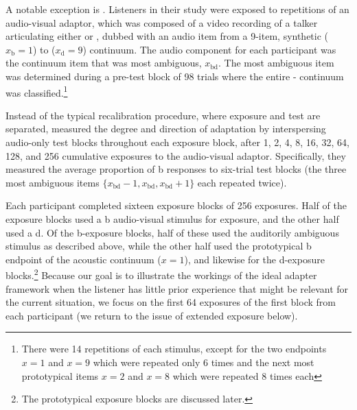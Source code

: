 A notable exception is .  Listeners in their study were exposed to repetitions of an audio-visual adaptor, which was composed of a video recording of a talker articulating either  or , dubbed with an audio item from a 9-item, synthetic  ($x_\mathrm{b}=1$) to  ($x_\mathrm{d}=9$) continuum.  The audio component for each participant was the continuum item that was most ambiguous, $x_\mathrm{bd}$.  The most ambiguous item was determined during a pre-test block of 98 trials where the entire - continuum was classified.\footnote{There were 14 repetitions of each stimulus, except for the two endpoints $x=1$ and $x=9$ which were repeated only 6 times and the next most prototypical items $x=2$ and $x=8$ which were repeated 8 times each}

Instead of the typical recalibration procedure, where exposure and test are separated,  measured the degree and direction of adaptation by interspersing audio-only test blocks throughout each exposure block, after 1, 2, 4, 8, 16, 32, 64, 128, and 256 cumulative exposures to the audio-visual adaptor.  Specifically, they measured the average proportion of \ph b responses to six-trial test blocks (the three most ambiguous items $\{x_\mathrm{bd}-1, x_\mathrm{bd}, x_\mathrm{bd}+1\}$ each repeated twice).

Each participant completed sixteen exposure blocks of 256 exposures.  Half of the exposure blocks used a \ph b audio-visual stimulus for exposure, and the other half used a \ph d.  Of the \ph b-exposure blocks, half of these used the auditorily ambiguous stimulus as described above, while the other half used the prototypical \ph b endpoint of the acoustic continuum ($x=1$), and likewise for the \ph d-exposure blocks.\footnote{The prototypical exposure blocks are discussed later.} %
Because our goal is to illustrate the workings of the ideal adapter framework when the listener has little prior experience that might be relevant for the current situation, we focus on the first 64 exposures of the first block from each participant (we return to the issue of extended exposure below).


